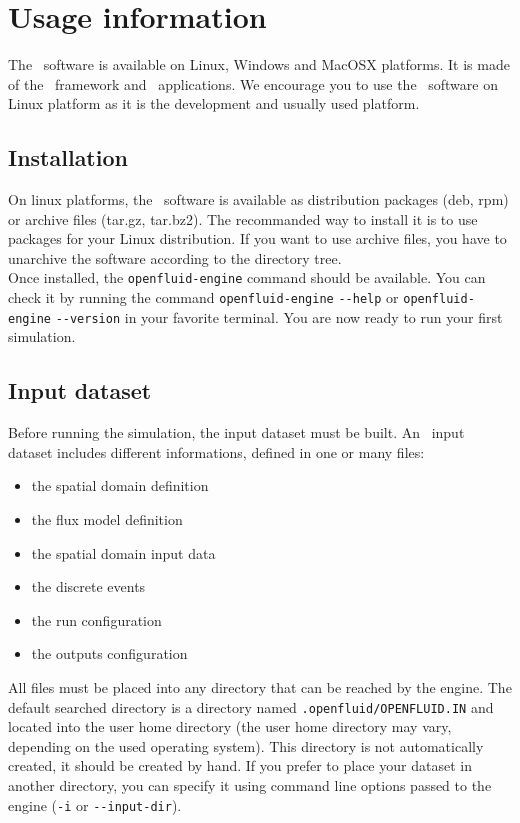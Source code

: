 \chapter{Usage information}

The \OFname \ software is available on Linux, Windows and MacOSX platforms.
It is made of the \OFname \ framework and \OFname \ applications. 
We encourage you to use the \OFname \ software on Linux platform as it is the
development and usually used platform.

\section{Installation}

On linux platforms, the \OFname \ software is available as distribution
packages (deb, rpm) or archive files (tar.gz, tar.bz2). The recommanded way to
install it is to use packages for your Linux distribution. If you want to use
archive files, you have to unarchive the software according to the directory tree.\\
Once installed, the \texttt{openfluid-engine} command should be available.
You can check it by running the command \texttt{openfluid-engine}
\verb?--?\texttt{help} or \texttt{openfluid-engine} \verb?--?\texttt{version}
in your favorite terminal. You are now ready to run your first simulation.

\section{Input dataset}

Before running the simulation, the input dataset must be built.
An \OFEname \ input dataset includes different informations, defined in one or
many files:
\begin{itemize}
  \item the spatial domain definition
  \item the flux model definition
  \item the spatial domain input data 
  \item the discrete events
  \item the run configuration
  \item the outputs configuration
\end{itemize}

\noindent All files must be placed into any directory that can be reached by the
engine. The default searched directory is a directory named
\texttt{.openfluid/OPENFLUID.IN} and located into the user home
directory (the user home directory may vary, depending on the used operating
system). This directory is not automatically created, it should be created by hand.
If you prefer to place your dataset in another directory, you can
specify it using command line options passed to the engine (\texttt{-i} or \verb?--?\texttt{input-dir}).\\

